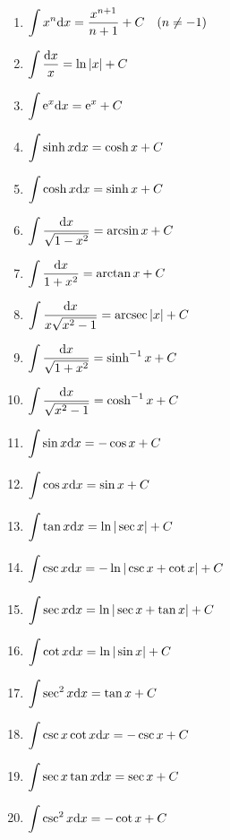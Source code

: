 

\begin{mdframed}
\begin{minipage}{0.5\linewidth}
\begin{enumerate}
\item $\displaystyle\int x^n\mathrm{d} x = \frac{x^{n+1}}{n+1}+C\quad (n\ne -1)$
\item $\displaystyle\int\frac{\mathrm{d} x}{x} = \ln|x| + C$
\item $\displaystyle\int\mathrm{e}^x\mathrm{d} x = \mathrm{e}^x + C$
\item $\displaystyle\int\sinh x\mathrm{d} x = \cosh x+C$
\item $\displaystyle\int\cosh x\mathrm{d} x=\sinh x + C$
\item $\displaystyle\int\frac{\mathrm{d} x}{\sqrt{1-x^2}} = \arcsin x + C$
\item $\displaystyle\int\frac{\mathrm{d} x}{1+x^2} = \arctan x + C$
\item $\displaystyle\int\frac{\mathrm{d} x}{x\sqrt{x^2-1}} = \operatorname{arcsec}|x|+C$
\item $\displaystyle\int\frac{\mathrm{d} x}{\sqrt{1+x^2}} = \sinh^{-1} x + C$
\item $\displaystyle\int\frac{\mathrm{d} x}{\sqrt{x^2-1}} = \cosh^{-1} x + C$
\end{enumerate}
\end{minipage}
\begin{minipage}{0.5\linewidth}
\begin{enumerate}
\setcounter{enumi}{10}
\item $\displaystyle\int\sin x\mathrm{d} x=-\cos x + C$
\item $\displaystyle\int\cos x\mathrm{d} x=\sin x +C$
\item $\displaystyle\int\tan x\mathrm{d} x=\ln|\sec x| + C$
\item $\displaystyle\int\csc x\mathrm{d} x=-\ln|\csc x+\cot x| + C$
\item $\displaystyle\int\sec x\mathrm{d} x=\ln|\sec x+\tan x|+C$
\item $\displaystyle\int\cot x\mathrm{d} x=\ln|\sin x| +C$
\item $\displaystyle\int\sec^2 x\mathrm{d} x = \tan x + C$
\item $\displaystyle\int\csc x\cot x\mathrm{d} x=-\csc x+C$
\item $\displaystyle\int\sec x\tan x\mathrm{d} x = \sec x+C$
\item $\displaystyle\int\csc^2 x\mathrm{d} x = -\cot x+C$
\end{enumerate}
\end{minipage}
\end{mdframed}

